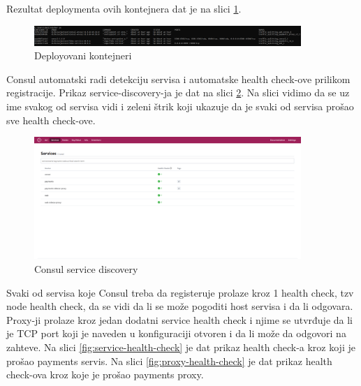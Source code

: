 \documentclass[a4paper,12pt]{report}
\begin{document}
Rezultat deploymenta ovih kontejnera dat je na slici \ref{fig:consul-services-deployment}.\newline

\begin{figure}[h]
    \centering
    \includegraphics[width=0.9\textwidth]{consul_services_deployment}
    \caption{Deployovani kontejneri}
    \label{fig:consul-services-deployment}
\end{figure} 

Consul automatski radi detekciju servisa i automatske health check-ove prilikom registracije. Prikaz service-discovery-ja je dat na slici \ref{fig:consul-service-discovery}. Na slici vidimo da se uz ime svakog od servisa vidi i zeleni štrik koji ukazuje da je svaki od servisa prošao sve health check-ove. \newline

\begin{figure}[h]
    \centering
    \includegraphics[width=0.9\textwidth]{consul_service_discovery}
    \caption{Consul service discovery}
    \label{fig:consul-service-discovery}
\end{figure} 

Svaki od servisa koje Consul treba da registeruje prolaze kroz 1 health check, tzv node health check, da se vidi da li se može pogoditi host servisa i da li odgovara. Proxy-ji prolaze kroz jedan dodatni service health check i njime se  utvrđuje da li je TCP port koji je naveden u konfiguraciji otvoren i da li može da odgovori na zahteve. Na slici \ref{fig:service-health-check} je dat prikaz health check-a kroz koji je prošao payments servis. Na slici \ref{fig:proxy-health-check} je dat prikaz health check-ova kroz koje je prošao payments proxy. \newline
\end{document}
